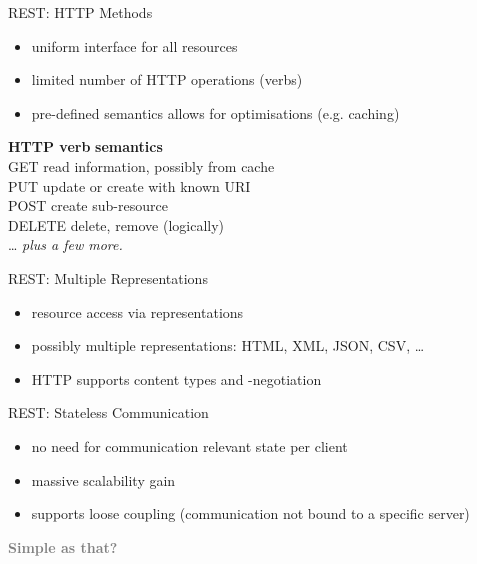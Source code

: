 \documentclass{beamer}
\begin{document}
\begin{frame}{REST: HTTP Methods}

  \begin{itemize}
    \item uniform interface for all resources
    \item limited number of HTTP operations (verbs)
    \item pre-defined semantics allows for optimisations (e.g. caching)
  \end{itemize}

  \begin{tabbing}
    {\bfseries HTTP verb} \hspace{0.3cm} \= {\bfseries semantics} \\
    GET    \>  read information, possibly from cache\\
    PUT    \>  update or create with known URI\\
    POST   \>  create sub-resource \\
    DELETE \>  delete, remove (logically)\\
    \dots  \>  \textit{plus a few more.}
  \end{tabbing}
\end{frame}

\begin{frame}{REST: Multiple Representations}

  \begin{itemize}
    \item resource access via representations
    \item possibly multiple representations: HTML, XML, JSON, CSV, \dots
    \item HTTP supports content types and -negotiation
  \end{itemize}
\end{frame}

\begin{frame}{REST: Stateless Communication}

  \begin{itemize}
    \item no need for communication relevant state per client
    \item massive scalability gain
    \item supports loose coupling (communication not bound to a specific server)
  \end{itemize}
\end{frame}

\begin{frame}
  \vspace*{-1cm}
  \textcolor{gray}{
    \begin{center}
      \textbf{
        \fontsize{60}{60}\selectfont Simple as that?
      }
    \end{center}
  }

\end{frame}
\end{document}
